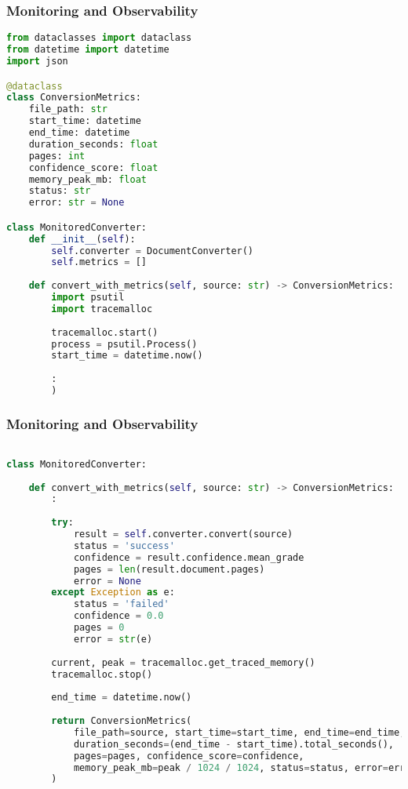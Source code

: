 \begin{frame}[fragile]\frametitle{Monitoring and Observability}

\begin{lstlisting}[language=Python, basicstyle=\tiny]
from dataclasses import dataclass
from datetime import datetime
import json

@dataclass
class ConversionMetrics:
    file_path: str
    start_time: datetime
    end_time: datetime
    duration_seconds: float
    pages: int
    confidence_score: float
    memory_peak_mb: float
    status: str
    error: str = None

class MonitoredConverter:
    def __init__(self):
        self.converter = DocumentConverter()
        self.metrics = []
        
    def convert_with_metrics(self, source: str) -> ConversionMetrics:
        import psutil
        import tracemalloc
        
        tracemalloc.start()
        process = psutil.Process()
        start_time = datetime.now()
        
		:
        )
\end{lstlisting}
\end{frame}

\begin{frame}[fragile]\frametitle{Monitoring and Observability}

\begin{lstlisting}[language=Python, basicstyle=\tiny]

class MonitoredConverter:
        
    def convert_with_metrics(self, source: str) -> ConversionMetrics:
        :
		
        try:
            result = self.converter.convert(source)
            status = 'success'
            confidence = result.confidence.mean_grade
            pages = len(result.document.pages)
            error = None
        except Exception as e:
            status = 'failed'
            confidence = 0.0
            pages = 0
            error = str(e)
        
        current, peak = tracemalloc.get_traced_memory()
        tracemalloc.stop()
        
        end_time = datetime.now()
        
        return ConversionMetrics(
            file_path=source, start_time=start_time, end_time=end_time,
            duration_seconds=(end_time - start_time).total_seconds(),
            pages=pages, confidence_score=confidence,
            memory_peak_mb=peak / 1024 / 1024, status=status, error=error
        )
\end{lstlisting}
\end{frame}


